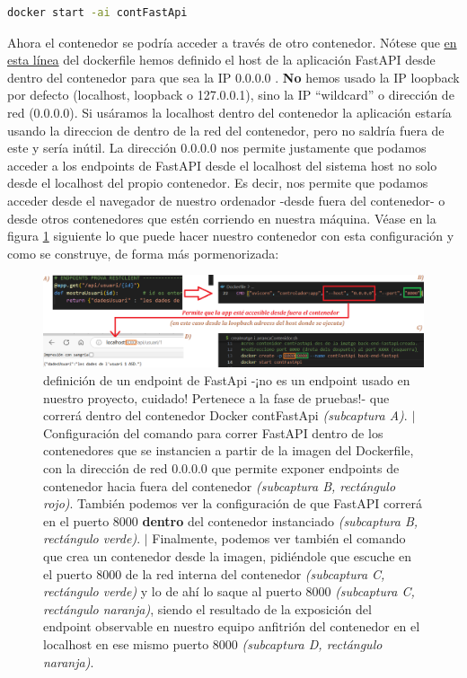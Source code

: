 \documentclass[a4paper,12pt]{report}
\begin{document}
	\begin{lstlisting}[language=bash]
		docker start -ai contFastApi
	\end{lstlisting}
	
	
	Ahora el contenedor se podría acceder a través de otro contenedor. Nótese que  \href{https://github.com/blackcub3s/mercApp/blob/cf678ebf99ce636b64c70c8faa239658a601550d/APP%20WEB/__FastAPI__/Dockerfile#L22}{en esta línea} del dockerfile hemos definido el host de la aplicación FastAPI desde dentro del contenedor para que sea la IP 0.0.0.0 . \textbf{No }hemos usado la IP loopback por defecto (localhost, loopback o 127.0.0.1), sino la IP ``wildcard'' o dirección de red (0.0.0.0). Si usáramos la localhost dentro del contenedor la aplicación estaría usando la direccion de dentro de la red del contenedor, pero no saldría fuera de este y sería inútil. La dirección 0.0.0.0 nos permite justamente que podamos acceder a los endpoints de FastAPI desde el localhost del sistema host no solo desde el localhost del propio contenedor. Es decir, nos permite que podamos acceder desde el navegador de nuestro ordenador -desde fuera del contenedor- o desde otros contenedores que estén corriendo en nuestra máquina. Véase en la figura \ref{fig:demofastapiendpointdummy} siguiente lo que puede hacer nuestro contenedor con esta configuración y como se construye, de forma más pormenorizada:
	
	\FloatBarrier
	\begin{figure}[H]
		\centering
		\caption{definición de un endpoint de FastApi -¡no es un endpoint usado en nuestro proyecto, cuidado! Pertenece a la fase de pruebas!- que correrá dentro del contenedor Docker contFastApi \textit{(subcaptura A)}. $|$ Configuración del comando para correr FastAPI dentro de los contenedores que se instancien a partir de la imagen del Dockerfile, con la dirección de red 0.0.0.0 que permite exponer endpoints de contenedor hacia fuera del contenedor \textit{(subcaptura B, rectángulo rojo)}. También podemos ver la configuración de que FastAPI correrá en el puerto 8000 \textbf{dentro} del contenedor instanciado \textit{(subcaptura B, rectángulo verde)}. $|$ Finalmente, podemos ver también el comando que crea un contenedor desde la imagen, pidiéndole que escuche en el puerto 8000 de la red interna del contenedor \textit{(subcaptura C, rectángulo verde)} y lo de ahí lo saque al puerto 8000 \textit{(subcaptura C, rectángulo naranja)}, siendo el resultado de la exposición del endpoint observable en nuestro equipo anfitrión del contenedor en el localhost en ese mismo puerto 8000 \textit{(subcaptura D, rectángulo naranja)}.}
		\label{fig:demofastapiendpointdummy}
		\includegraphics[width=1\linewidth]{img/demoFastApiEndpointDummy}
	\end{figure}
	\FloatBarrier
	
\end{document}
